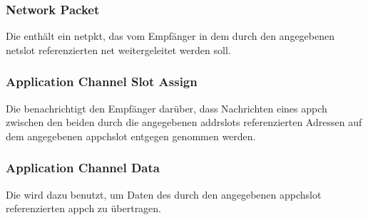 \isprotoicreqbytefield


\subsubsection{Network Packet}
\label{dcl-isproto-np}
Die \msg{\isprotonp} enthält ein \gls{netpkt}, das vom Empfänger in dem durch den angegebenen
\gls{netslot} referenzierten \gls{net} weitergeleitet werden soll.

\isprotonpbytefield


\subsubsection{Application Channel Slot Assign}
\label{dcl-isproto-acsa}
Die \msg{\isprotoacsa} benachrichtigt den Empfänger darüber, dass Nachrichten eines \gls{appch} %
zwischen den beiden durch die angegebenen \glspl{addrslot} referenzierten Adressen auf dem
angegebenen \gls{appchslot} entgegen genommen werden.

\isprotoacsabytefield


\subsubsection{Application Channel Data}
\label{dcl-isproto-acd}
Die \msg{\isprotoacd} wird dazu benutzt, um Daten des durch den angegebenen \gls{appchslot} %
referenzierten \gls{appch} zu übertragen.

\isprotoacdbytefield


